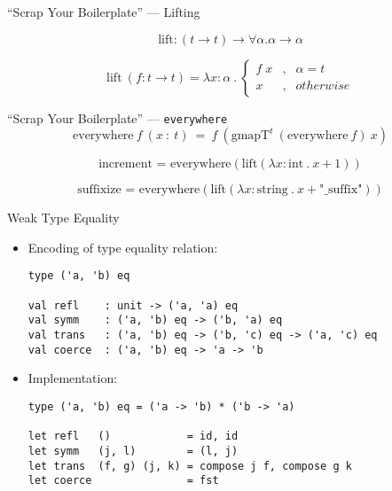 \begin{frame}[fragile]{``Scrap Your Boilerplate'' --- Lifting}

$$
\mbox{lift} : (t\to t)\to\forall\alpha.\alpha\to\alpha
$$

\pause

$$
\mbox{lift}\: (f : t \to t)=\lambda x:\alpha\:.\:\left\{
  \begin{array}{rcl}
    f\; x&,&\alpha=t\\
    x  &,&otherwise
  \end{array}
\right.
$$

\end{frame}

\begin{frame}[fragile]{``Scrap Your Boilerplate'' --- \texttt{everywhere}}
$$
\mbox{everywhere}\:f\:(x\::\:t)\:=\:f\:(\mbox{gmapT}^t\:(\mbox{everywhere}\:f)\:x)
$$

\pause

$$
\mbox{increment = everywhere} (\mbox{lift} (\lambda x : \mbox{int}\:.\: x+1))
$$

\pause

$$
\mbox{suffixize = everywhere} (\mbox{lift} (\lambda x : \mbox{string}\:.\: x + \mbox{"\_suffix"}))
$$

\end{frame}

\begin{frame}[fragile]{Weak Type Equality}

\begin{itemize}
\item Encoding of type equality relation:

\begin{lstlisting}
type ('a, 'b) eq

val refl    : unit -> ('a, 'a) eq
val symm    : ('a, 'b) eq -> ('b, 'a) eq
val trans   : ('a, 'b) eq -> ('b, 'c) eq -> ('a, 'c) eq
val coerce  : ('a, 'b) eq -> 'a -> 'b
\end{lstlisting}

\pause
\item Implementation:

\begin{lstlisting}
type ('a, 'b) eq = ('a -> 'b) * ('b -> 'a)

let refl   ()            = id, id
let symm   (j, l)        = (l, j)
let trans  (f, g) (j, k) = compose j f, compose g k
let coerce               = fst
\end{lstlisting}
\end{itemize}

\end{frame}

